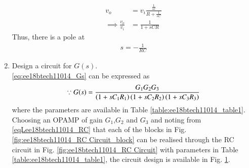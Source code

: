 \begin{enumerate}[label=\thesection.\arabic*.,ref=\thesection.\theenumi]
\solution
\begin{align}
v_o &= v_i \frac{\frac{1}{sc}}{R + \frac{1}{sC}}
\\
\implies \frac{v_o}{v_i}&= \frac{1}{1+sCR}
\label{eqLee18btech11014_RC}
\end{align}
%
Thus, there is a pole at
%
\begin{align}
s = -\frac{1}{RC}
\end{align}
%
%
\item Design a circuit for $G(s)$.
\\
\solution \eqref{eq:ee18btech11014_Gs} can be expressed as
%
\begin{align}
\because G(s) = \frac{G_1 G_2 G_3}{\left(1+sC_1R_1\right)\left(1+sC_2R_2\right)\left(1+sC_3R_3\right)}
\end{align}
%
where the parameters are available in Table \ref{table:ee18btech11014_table1}.  Choosing an OPAMP of gain %
$G_1$,$G_2$ and $G_3$ and noting from \eqref{eqLee18btech11014_RC} that each of the blocks in Fig.  	\ref{fig:ee18btech11014_RC Circuit_block} can be realised through the RC circuit in Fig.  	\ref{fig:ee18btech11014_RC Circuit} with parameters in Table \ref{table:ee18btech11014_table1}, the circuit design is available in 
Fig.  	\ref{fig:ee18btech11014_Open-Loop Circuit}. 
%
\begin{table}[!ht]
\centering

\caption{}
\label{table:ee18btech11014_table1}
\end{table}
%
\begin{figure}[ht!]
	\begin{center}
		\resizebox{\columnwidth/1}{!}{}
	\end{center}
	\caption{}
	\label{fig:ee18btech11014_Open-Loop Circuit}
\end{figure}
 

\end{enumerate}
